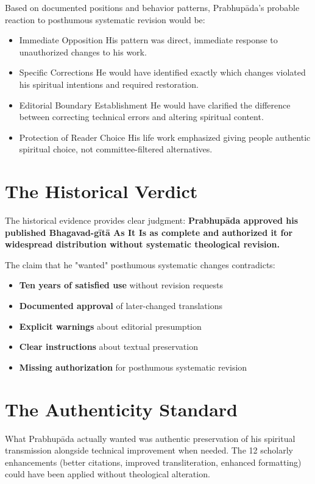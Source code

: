 \documentclass[11pt,twoside]{book}
\begin{document}
Based on documented positions and behavior patterns, Prabhupāda's probable reaction to posthumous systematic revision would be:
\begin{itemize}
\item Immediate Opposition
\label{sec:orgbff4e2e}
His pattern was direct, immediate response to unauthorized changes to his work.
\item Specific Corrections
\label{sec:orgc0b9eed}
He would have identified exactly which changes violated his spiritual intentions and required restoration.
\item Editorial Boundary Establishment
\label{sec:org577e109}
He would have clarified the difference between correcting technical errors and altering spiritual content.
\item Protection of Reader Choice
\label{sec:org968837a}
His life work emphasized giving people authentic spiritual choice, not committee-filtered alternatives.
\end{itemize}
\section*{The Historical Verdict}
\label{sec:org3ede8a3}

The historical evidence provides clear judgment: \textbf{\textbf{Prabhupāda approved his published Bhagavad-gītā As It Is as complete and authorized it for widespread distribution without systematic theological revision.}}

The claim that he "wanted" posthumous systematic changes contradicts:
\begin{itemize}
\item \textbf{\textbf{Ten years of satisfied use}} without revision requests
\item \textbf{\textbf{Documented approval}} of later-changed translations
\item \textbf{\textbf{Explicit warnings}} about editorial presumption
\item \textbf{\textbf{Clear instructions}} about textual preservation
\item \textbf{\textbf{Missing authorization}} for posthumous systematic revision
\end{itemize}
\section*{The Authenticity Standard}
\label{sec:org4633ffc}

What Prabhupāda actually wanted was authentic preservation of his spiritual transmission alongside technical improvement when needed. The 12 scholarly enhancements (better citations, improved transliteration, enhanced formatting) could have been applied without theological alteration.
\end{document}

